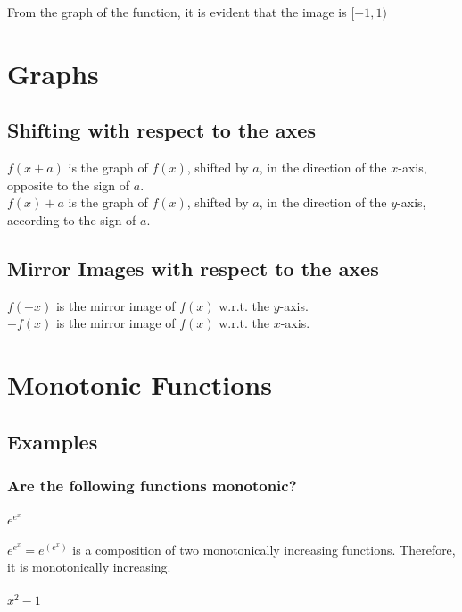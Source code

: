 \documentclass[fleqn]{article}
\begin{document}
From the graph of the function, it is evident that the image is $[-1,1)$

\newpage
\section{Graphs}

\subsection{Shifting with respect to the axes}
$f(x+a)$ is the graph of $f(x)$, shifted by $a$, in the direction of the $x$-axis, opposite to the sign of $a$. \\
$f(x) + a$ is the graph of $f(x)$, shifted by $a$, in the direction of the $y$-axis, according to the sign of $a$. \\

\subsection{Mirror Images with respect to the axes}

$f(-x)$ is the mirror image of $f(x)$ w.r.t. the $y$-axis.\\
$-f(x)$ is the mirror image of $f(x)$ w.r.t. the $x$-axis.\\

\newpage
\section{Monotonic Functions}

\subsection{Examples}

\subsubsection{Are the following functions monotonic?}

\paragraph{$e^{e^x}$\\}

$e^{e^x} = e^{(e^x)}$ is a composition of two monotonically increasing functions. Therefore, it is monotonically increasing.

\paragraph{$x^2 - 1$\\}
\end{document}
